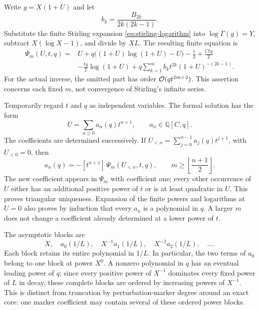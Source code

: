 Write $g=X(1+U)$ and let
\[
 b_k=\frac{B_{2k}}{2k(2k-1)}.
\]
Substitute the finite Stirling expansion
\eqref{eq:stirling-logarithm} into $\log\Gamma(g)=Y$, subtract
$X(\log X-1)$, and divide by $XL$. The resulting finite equation is
\begin{equation}
\begin{aligned}
 \Psi_m(U,t,q)={}&U+q\bigl((1+U)\log(1+U)-U\bigr)
       -\frac t2+\frac{Ctq}{2}\\
 &-\frac{tq}{2}\log(1+U)
       +q\sum_{k=1}^{m}b_k t^{2k}(1+U)^{-(2k-1)}.
\end{aligned}
 \label{eq:gamma-inverse-normalized-equation}
\end{equation}
For the actual inverse, the omitted part has order
$\mathcal O(qt^{2m+2})$. This assertion concerns each fixed $m$, not
convergence of Stirling's infinite series.

Temporarily regard $t$ and $q$ as independent variables. The formal
solution has the form
\begin{equation}
 U=\sum_{n\ge0}a_n(q)t^{n+1},\qquad a_n\in\mathbb Q[C,q].
 \label{eq:gamma-inverse-unit-series}
\end{equation}
The coefficients are determined successively. If
$U_{<n}=\sum_{j=0}^{n-1}a_j(q)t^{j+1}$, with $U_{<0}=0$, then
\begin{equation}
 a_n(q)=-[t^{n+1}]\,\Psi_m(U_{<n},t,q),
 \qquad m\ge\left\lfloor\frac{n+1}{2}\right\rfloor.
 \label{eq:gamma-inverse-coefficient-recurrence}
\end{equation}
The new coefficient appears in $\Psi_m$ with coefficient one; every
other occurrence of $U$ either has an additional positive power of $t$
or is at least quadratic in $U$. This proves triangular uniqueness.
Expansion of the finite powers and logarithms at $U=0$ also proves by
induction that every $a_n$ is a polynomial in $q$. A larger $m$ does not
change a coefficient already determined at a lower power of $t$.

The asymptotic blocks are
\[
 X,\quad a_0(1/L),\quad X^{-1}a_1(1/L),\quad
 X^{-2}a_2(1/L),\quad\ldots.
\]
Each block retains its entire polynomial in $1/L$. In particular, the
two terms of $a_0$ belong to one block at power $X^0$. A nonzero
polynomial in $q$ has an eventual leading power of $q$; since every
positive power of $X^{-1}$ dominates every fixed power of $L$ in decay,
these complete blocks are ordered by increasing powers of $X^{-1}$.
This is distinct from truncation by perturbation-marker degree around
an exact core: one marker coefficient may contain several of these
ordered power blocks.

